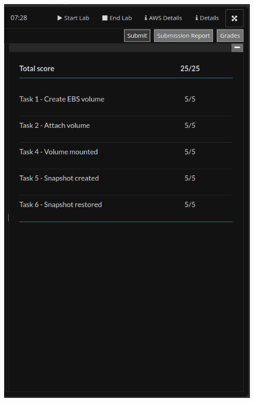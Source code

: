 \documentclass[11pt]{article}
\begin{document}
{\centering
\includegraphics[width=5.0in]{pics/grades.png}
}
\end{document}
